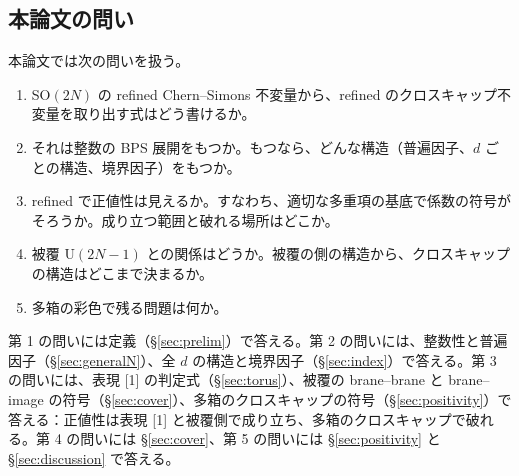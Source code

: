 \subsection{本論文の問い}
本論文では次の問いを扱う。
\begin{enumerate}
\item SO$(2N)$ の refined Chern--Simons 不変量から、refined のクロスキャップ不変量を取り出す式はどう書けるか。
\item それは整数の BPS 展開をもつか。もつなら、どんな構造（普遍因子、$d$ ごとの構造、境界因子）をもつか。
\item refined で正値性は見えるか。すなわち、適切な多重項の基底で係数の符号がそろうか。成り立つ範囲と破れる場所はどこか。
\item 被覆 U$(2N-1)$ との関係はどうか。被覆の側の構造から、クロスキャップの構造はどこまで決まるか。
\item 多箱の彩色で残る問題は何か。
\end{enumerate}
第 1 の問いには定義（§\ref{sec:prelim}）で答える。第 2 の問いには、整数性と普遍因子（§\ref{sec:generalN}）、全 $d$ の構造と境界因子（§\ref{sec:index}）で答える。第 3 の問いには、表現 [1] の判定式（§\ref{sec:torus}）、被覆の brane--brane と brane--image の符号（§\ref{sec:cover}）、多箱のクロスキャップの符号（§\ref{sec:positivity}）で答える：正値性は表現 [1] と被覆側で成り立ち、多箱のクロスキャップで破れる。第 4 の問いには §\ref{sec:cover}、第 5 の問いには §\ref{sec:positivity} と §\ref{sec:discussion} で答える。

